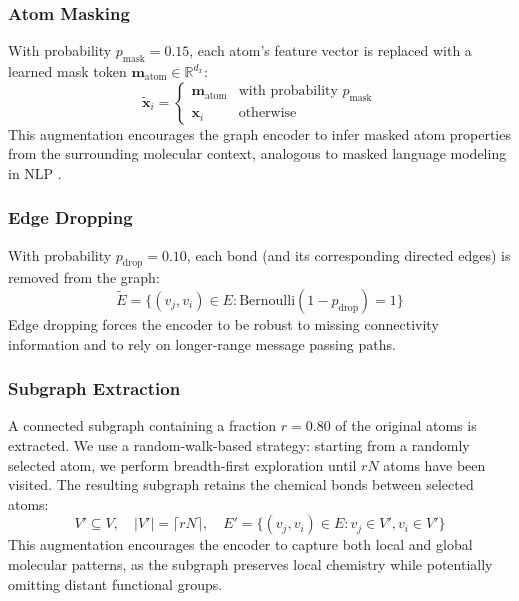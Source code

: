 \documentclass[a4paper,fleqn]{cas-sc}
\begin{document}
\subsubsection{Atom Masking}

With probability $p_{\text{mask}} = 0.15$, each atom's feature vector is replaced with a learned mask token $\mathbf{m}_{\text{atom}} \in \mathbb{R}^{d_x}$:
\begin{equation}
\tilde{\mathbf{x}}_i = \begin{cases} \mathbf{m}_{\text{atom}} & \text{with probability } p_{\text{mask}} \\ \mathbf{x}_i & \text{otherwise} \end{cases}
\end{equation}
This augmentation encourages the graph encoder to infer masked atom properties from the surrounding molecular context, analogous to masked language modeling in NLP \citep{devlin2019bert}.

\subsubsection{Edge Dropping}

With probability $p_{\text{drop}} = 0.10$, each bond (and its corresponding directed edges) is removed from the graph:
\begin{equation}
\tilde{E} = \{(v_j, v_i) \in E : \text{Bernoulli}(1 - p_{\text{drop}}) = 1\}
\end{equation}
Edge dropping forces the encoder to be robust to missing connectivity information and to rely on longer-range message passing paths.

\subsubsection{Subgraph Extraction}

A connected subgraph containing a fraction $r = 0.80$ of the original atoms is extracted. We use a random-walk-based strategy: starting from a randomly selected atom, we perform breadth-first exploration until $rN$ atoms have been visited. The resulting subgraph retains the chemical bonds between selected atoms:
\begin{equation}
V' \subseteq V, \quad |V'| = \lceil rN \rceil, \quad E' = \{(v_j, v_i) \in E : v_j \in V', v_i \in V'\}
\end{equation}
This augmentation encourages the encoder to capture both local and global molecular patterns, as the subgraph preserves local chemistry while potentially omitting distant functional groups.
\end{document}

